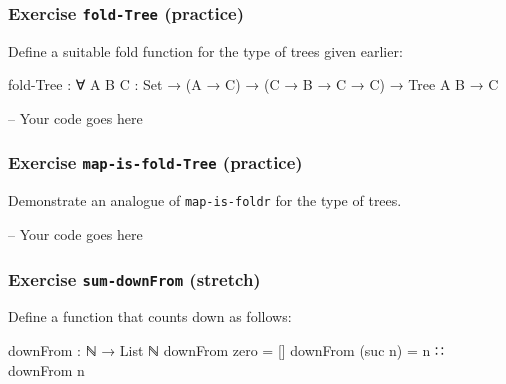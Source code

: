 \hypertarget{exercise-fold-tree-practice}{%
\subsubsection{\texorpdfstring{Exercise \texttt{fold-Tree}
(practice)}{Exercise fold-Tree (practice)}}\label{exercise-fold-tree-practice}}

Define a suitable fold function for the type of trees given earlier:

\begin{myDisplay}
fold-Tree : ∀ {A B C : Set} → (A → C) → (C → B → C → C) → Tree A B → C
\end{myDisplay}

\begin{fence}
\begin{code}
-- Your code goes here
\end{code}
\end{fence}

\hypertarget{exercise-map-is-fold-tree-practice}{%
\subsubsection{\texorpdfstring{Exercise \texttt{map-is-fold-Tree}
(practice)}{Exercise map-is-fold-Tree (practice)}}\label{exercise-map-is-fold-tree-practice}}

Demonstrate an analogue of \texttt{map-is-foldr} for the type of trees.

\begin{fence}
\begin{code}
-- Your code goes here
\end{code}
\end{fence}

\hypertarget{exercise-sum-downfrom-stretch}{%
\subsubsection{\texorpdfstring{Exercise \texttt{sum-downFrom}
(stretch)}{Exercise sum-downFrom (stretch)}}\label{exercise-sum-downfrom-stretch}}

Define a function that counts down as follows:

\begin{fence}
\begin{code}
downFrom : ℕ → List ℕ
downFrom zero     =  []
downFrom (suc n)  =  n ∷ downFrom n
\end{code}
\end{fence}

